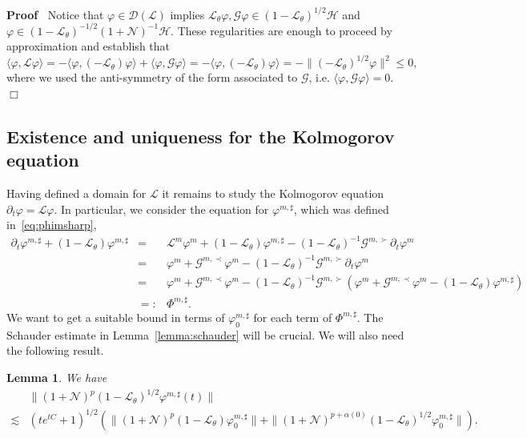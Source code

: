\documentclass{article}
\newcommand{\backassign}{=:}
\newenvironment{proof}{\noindent\textbf{Proof\ }}{\hspace*{\fill}$\Box$\medskip}
\newtheorem{lemma}{Lemma}
\begin{document}
\begin{proof}
  Notice that $\varphi \in \mathcal{D} (\mathcal{L})$ implies
  $\mathcal{L}_{\theta} \varphi, \mathcal{G} \varphi \in (1
  -\mathcal{L}_{\theta})^{1 / 2} \mathcal{H}$ and $\varphi \in (1
  -\mathcal{L}_{\theta})^{- 1 / 2} (1 +\mathcal{N})^{- 1} \mathcal{H}$. These
  regularities are enough to proceed by approximation and establish that
  \[ \langle \varphi, \mathcal{L} \varphi \rangle = - \langle \varphi,
     (-\mathcal{L}_{\theta}) \varphi \rangle + \langle \varphi, \mathcal{G}
     \varphi \rangle = - \langle \varphi, (-\mathcal{L}_{\theta}) \varphi
     \rangle = - \| (-\mathcal{L}_{\theta})^{1 / 2} \varphi \|^2 \leqslant 0,
  \]
  where we used the anti-symmetry of the form associated to $\mathcal{G}$,
  i.e. $\langle \varphi, \mathcal{G} \varphi \rangle = 0$.
\end{proof}

\subsection{Existence and uniqueness for the Kolmogorov equation}

Having defined a domain for $\mathcal{L}$ it remains to study the Kolmogorov
equation $\partial_t \varphi =\mathcal{L} \varphi$. In particular, we consider
the equation for $\varphi^{m, \sharp}$, which was defined
in~{\eqref{eq:phimsharp}},
\[ \begin{array}{lll}
     \partial_t \varphi^{m, \sharp} + (1 -\mathcal{L}_{\theta}) \varphi^{m,
     \sharp} & = & \mathcal{L}^m \varphi^m + (1 -\mathcal{L}_{\theta})
     \varphi^{m, \sharp} - (1 -\mathcal{L}_{\theta})^{- 1} \mathcal{G}^{m,
     \succ} \partial_t \varphi^m\\
     & = & \varphi^m +\mathcal{G}^{m, \prec} \varphi^m - (1
     -\mathcal{L}_{\theta})^{- 1} \mathcal{G}^{m, \succ} \partial_t
     \varphi^m\\
     & = & \varphi^m +\mathcal{G}^{m, \prec} \varphi^m - (1
     -\mathcal{L}_{\theta})^{- 1} \mathcal{G}^{m, \succ} (\varphi^m
     +\mathcal{G}^{m, \prec} \varphi^m - (1 -\mathcal{L}_{\theta}) \varphi^{m,
     \sharp})\\
     & \backassign & \Phi^{m, \sharp} .
   \end{array} \]
We want to get a suitable bound in terms of $\varphi^{m, \sharp}_0$ for each
term of $\Phi^{m, \sharp}$. The Schauder estimate in
Lemma~\ref{lemma:schauder} will be crucial. We will also need the following
result.

\begin{lemma}
  We have
  \begin{equation}
    \begin{array}{ll}
      & \| (1 +\mathcal{N})^p (1 -\mathcal{L}_{\theta})^{1 / 2} \varphi^{m,
      \sharp} (t) \|\\
      \lesssim & (t e^{t C} + 1)^{1 / 2} (\| (1 +\mathcal{N})^p (1
      -\mathcal{L}_{\theta}) \varphi_0^{m, \sharp} \| + \| (1 +\mathcal{N})^{p
      + \alpha (0)} (1 -\mathcal{L}_{\theta})^{1 / 2} \varphi_0^{m, \sharp}
      \|) .
    \end{array} \label{eq:est-phi-sharp}
  \end{equation}
\end{lemma}
\end{document}
